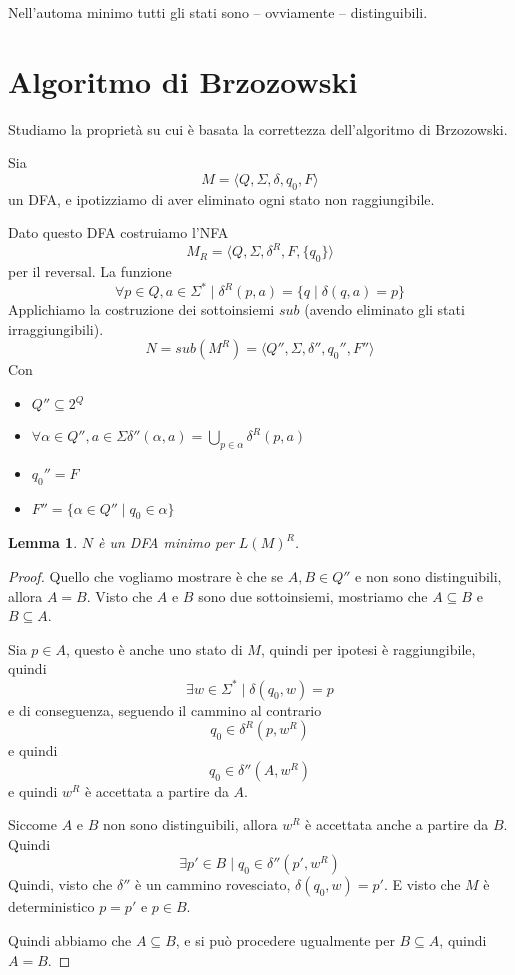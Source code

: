 \documentclass[12pt]{article}
\newtheorem{lemma}{Lemma}
\begin{document}
\tableofcontents
\newpage
Nell'automa minimo tutti gli stati sono -- ovviamente -- distinguibili.

\section{Algoritmo di Brzozowski}
Studiamo la proprietà su cui è basata la correttezza dell'algoritmo di Brzozowski.

Sia
$$ M = \langle Q, \Sigma, \delta, q_0, F \rangle$$
un DFA, e ipotizziamo di aver eliminato ogni stato non raggiungibile.

Dato questo DFA costruiamo l'NFA 
$$ M_R = \langle Q, \Sigma, \delta^R, F, \{ q_0 \} \rangle $$ %
per il reversal.
La funzione 
$$ \forall p \in Q, a \in \Sigma^* \mid \delta^R(p, a) = \{ q \mid \delta(q, a) = p \} $$
Applichiamo la costruzione dei sottoinsiemi $sub$ (avendo eliminato gli stati irraggiungibili).
$$ N = sub(M^R) = \langle Q'', \Sigma, \delta'', q_0'', F'' \rangle $$
Con
\begin{itemize}
	\item $Q'' \subseteq 2^Q $
	\item $\forall \alpha \in Q'', a \in \Sigma \delta''(\alpha, a) = \bigcup_{p \in \alpha} \delta^R (p, a) $
	\item $ q_0'' = F $
	\item $ F'' = \{ \alpha \in Q'' \mid q_0 \in \alpha \} $
\end{itemize}

\begin{lemma}
	$N$ è un DFA minimo per $L(M)^R$.
\end{lemma}
\begin{proof}
	Quello che vogliamo mostrare è che se $A, B \in Q''$ e non sono distinguibili, allora $A = B$.
	Visto che $A$ e $B$ sono due sottoinsiemi, mostriamo che $A \subseteq B$ e $B \subseteq A$.

	Sia $p \in A$, questo è anche uno stato di $M$, quindi per ipotesi è raggiungibile, quindi
	$$ \exists w \in \Sigma^* \mid \delta(q_0, w) = p $$
	e di conseguenza, seguendo il cammino al contrario
	$$ q_0 \in \delta^R (p, w^R) $$
	e quindi
	$$ q_0 \in \delta'' (A, w^R) $$
	e quindi $w^R$ è accettata a partire da $A$.

	Siccome $A$ e $B$ non sono distinguibili, allora $w^R$ è accettata anche a partire da $B$.
	Quindi
	$$ \exists p' \in B \mid q_0 \in \delta''(p', w^R) $$
	Quindi, visto che $\delta''$ è un cammino rovesciato, $\delta(q_0, w) = p'$.
	E visto che $M$ è deterministico $p = p'$ e $p \in B$.

	Quindi abbiamo che $A \subseteq B$, e si può procedere ugualmente per $B \subseteq A$, quindi $A = B$.
\end{proof}
\end{document}
